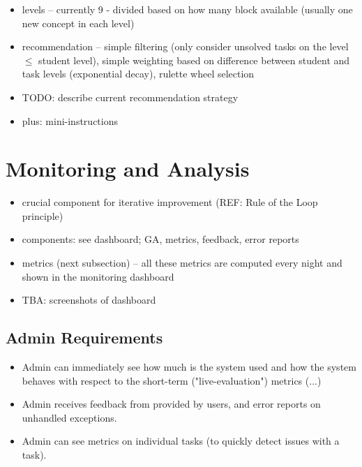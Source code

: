 \begin{itemize}
\item levels -- currently 9 - divided based on how many block available (usually one new concept in each level)
\item recommendation -- simple filtering (only consider unsolved tasks on the level $\leq$ student level), simple weighting based on difference between student and task levels (exponential decay), rulette wheel selection
\item TODO: describe current recommendation strategy
\item plus: mini-instructions
\end{itemize}





\section{Monitoring and Analysis}
\label{sec:robomission.monitoring}

\begin{itemize}
\item crucial component for iterative improvement (REF: Rule of the Loop principle)
\item components: see dashboard; GA, metrics, feedback, error reports
\item metrics (next subsection) -- all these metrics are computed every night and shown in the monitoring dashboard
\item TBA: screenshots of dashboard
\end{itemize}

\subsection{Admin Requirements}
\begin{itemize}
\item Admin can immediately see how much is the system used and how the system behaves with respect to the short-term ("live-evaluation") metrics (...)
\item Admin receives feedback from provided by users, and error reports on unhandled exceptions.
\item Admin can see metrics on individual tasks (to quickly detect issues with a task).
\end{itemize}


